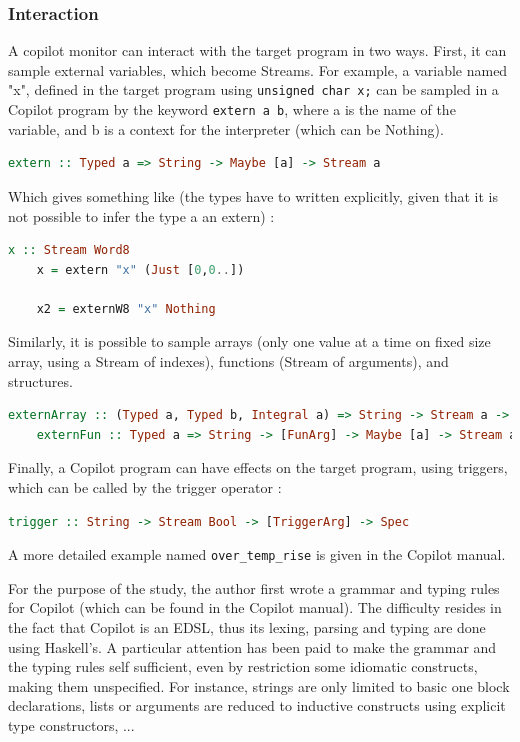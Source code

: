 \documentclass[a4paper,11pt,final]{article}
\begin{document}
	\subsubsection{Interaction}
	A copilot monitor can interact with the target program in two ways. First, it can sample external variables, which become Streams. For example, a variable named "x", defined in the target program using \texttt{unsigned char x;} can be sampled in a Copilot program by the keyword \texttt{extern a b}, where a is the name of the variable, and b is a context for the interpreter (which can be Nothing).
	\begin{lstlisting}[language=Haskell]
	extern :: Typed a => String -> Maybe [a] -> Stream a
	\end{lstlisting}
	
	Which gives something like (the types have to written explicitly, given that it is not possible to infer the type a an extern) :
	
	\begin{lstlisting}[language=Haskell]
	x :: Stream Word8
	x = extern "x" (Just [0,0..])
	
	x2 = externW8 "x" Nothing
	\end{lstlisting}
	
	Similarly, it is possible to sample arrays (only one value at a time on fixed size array, using a Stream of indexes), functions (Stream of arguments), and structures.
	
	\begin{lstlisting}[language=Haskell]
	externArray :: (Typed a, Typed b, Integral a) => String -> Stream a -> Int -> Maybe [[a]] -> Stream b
	externFun :: Typed a => String -> [FunArg] -> Maybe [a] -> Stream a
	\end{lstlisting}
	
	Finally, a Copilot program can have effects on the target program, using triggers, which can be called by the trigger operator :
	
	\begin{lstlisting}[language=Haskell]
	trigger :: String -> Stream Bool -> [TriggerArg] -> Spec
	\end{lstlisting}
	
	A more detailed example named \texttt{over\_temp\_rise} is given in the Copilot manual\cite{Copilot07}. 
	
	For the purpose of the study, the author first wrote a grammar and typing rules for Copilot (which can be found in the Copilot manual\cite{Copilot08}). The difficulty resides in the fact that Copilot is an EDSL, thus its lexing, parsing and typing are done using Haskell's. A particular attention has been paid to make the grammar and the typing rules self sufficient, even by restriction some idiomatic constructs, making them unspecified. For instance, strings are only limited to basic one block declarations, lists or arguments are reduced to inductive constructs using explicit type constructors, ...
	
\end{document}

